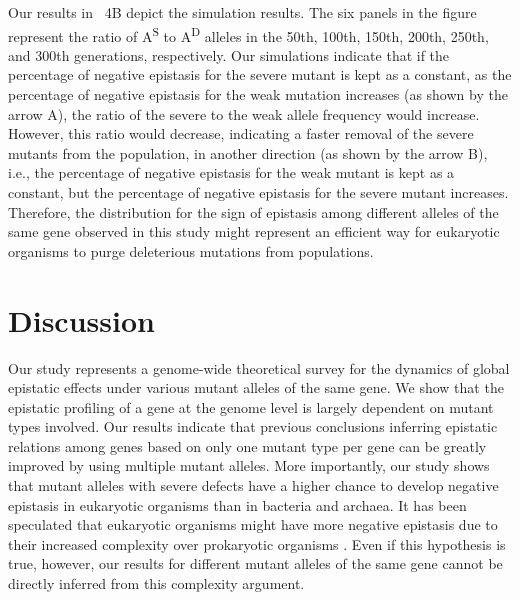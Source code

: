 Our results in \Fig~4B depict the simulation results. The six panels
in the figure represent the ratio of A\textsuperscript{S} to
A\textsuperscript{D} alleles in the 50th,
100th, 150th, 200th, 250th, and 300th generations, respectively. Our
simulations indicate that if the percentage of negative epistasis for
the severe mutant is kept as a constant, as the percentage of negative
epistasis for the weak mutation increases (as shown by the arrow A),
the ratio of the severe to the weak allele frequency would
increase. However, this ratio would decrease, indicating a faster
removal of the severe mutants from the population, in another
direction (as shown by the arrow B), i.e., the percentage of negative
epistasis for the weak mutant is kept as a constant, but the
percentage of negative epistasis for the severe mutant
increases. Therefore, the distribution for the sign of epistasis among
different alleles of the same gene observed in this study might
represent an efficient way for eukaryotic organisms to purge
deleterious mutations from populations.

\section{Discussion}
Our study represents a genome-wide theoretical survey for the dynamics
of global epistatic effects under various mutant alleles of the same
gene. We show that the epistatic profiling of a gene at the genome
level is largely dependent on mutant types involved. Our results
indicate that previous conclusions inferring epistatic relations among
genes based on only one mutant type per gene can be greatly improved
by using multiple mutant alleles. More importantly, our study shows
that mutant alleles with severe defects have a higher chance to
develop negative epistasis in eukaryotic organisms than in bacteria
and archaea. It has been speculated that eukaryotic organisms might
have more negative epistasis due to their increased complexity over
prokaryotic organisms \citep{Sanjuan2006, Sanjuan2008}. Even if this hypothesis is true,
however, our results for different mutant alleles of the same gene
cannot be directly inferred from this complexity argument.

